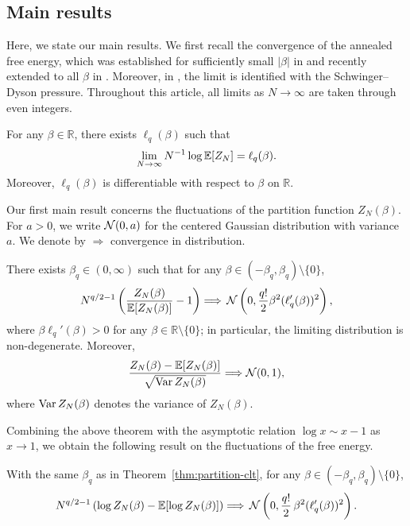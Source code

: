 \documentclass[../CLT_SYK.tex]{subfiles}
\begin{document}
\subsection{Main results}
Here, we state our main results. 
We first recall the convergence of the annealed free energy, which was established for sufficiently small $|\beta|$ in \cite{GPSZ2026} and recently extended to all $\beta$ in \cite{He2026}. Moreover, in \cite{He2026}, the limit is identified with the Schwinger--Dyson pressure. Throughout this article, all limits as $N \to \infty$ are taken through even integers.
\begin{theorem}\label{thm: input}
For any $\beta\in \mathbb R$, there exists  $\ell_q(\beta)$ such that
\begin{align*}
    \lim_{N\to \infty} N^{-1} \log \mathbb E[Z_N] =\ell_q(\beta).
\end{align*}
Moreover, $\ell_q(\beta)$ is differentiable with respect to $\beta$ on $\mathbb R$.
\end{theorem}



Our first main result concerns the fluctuations of the partition function ${Z_N(\beta)}$. For $a > 0$, we write $\mathcal N(0, a)$ for the centered Gaussian distribution with variance $a$. We denote by $\Longrightarrow$ convergence in distribution.
\begin{theorem}
\label{thm:partition-clt}
There exists $\beta_q\in (0,\infty)$ such that for any $\beta\in (-\beta_q,\beta_q) \setminus \{0\}$,  
 \begin{equation}\label{eq:scaled-relative-clt}
  N^{q/2-1}\left( \frac{Z_N(\beta)}{\mathbb E[Z_N(\beta)]} - 1\right)
  \Longrightarrow
  \,\mathcal N\left(0,\frac{q!}{2}\beta^2(\ell_q'(\beta))^2\right),
\end{equation}
where  $\beta \ell_q'(\beta)>0$ for any $\beta\in \mathbb R\setminus \{0\}$; in particular, the limiting distribution is non-degenerate. Moreover,
\begin{equation}\label{eq:standardized-clt}
  \frac{Z_N(\beta)-\mathbb E[Z_N(\beta)]}
  {\sqrt{\operatorname{Var} Z_N(\beta)}}
  \Longrightarrow\mathcal N(0,1),
\end{equation}
where $\operatorname{Var} Z_N(\beta)$ denotes the variance of $Z_N(\beta)$.
\end{theorem}

Combining the above theorem with the asymptotic relation $\log x \sim x-1$ as $x \to 1$, we obtain the following result on the fluctuations of the free energy.
\begin{theorem}\label{thm:free-energy-clt}
With the same $\beta_q$ as in Theorem~\ref{thm:partition-clt}, for any $\beta\in (-\beta_q,\beta_q) \setminus \{0\}$,
\[
  N^{q/2-1}\left(
    \log Z_N(\beta)-\mathbb E[\log Z_N(\beta)]
  \right)
  \Longrightarrow
  \,\mathcal N\left(0,\frac{q!}{2}\,\beta^2(\ell_q'(\beta))^2\right).
\]
\end{theorem}
\end{document}
